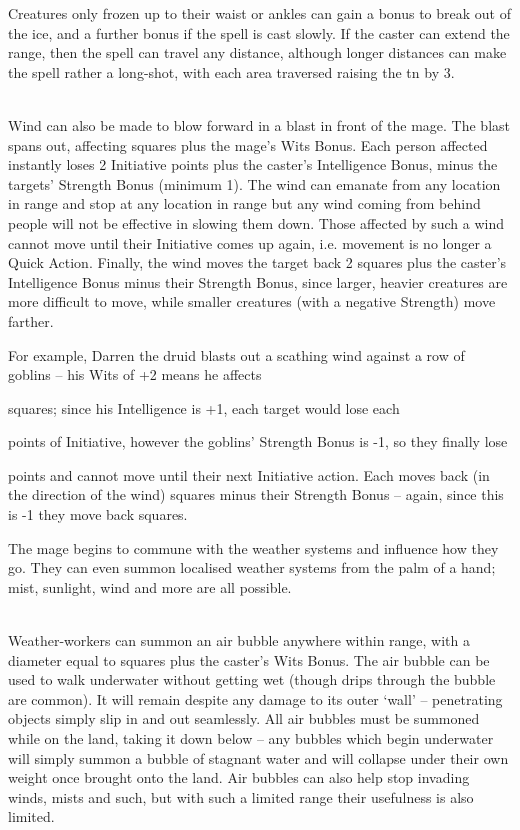 \begin{multicols}{2}
Creatures only frozen up to their waist or ankles can gain a bonus to break out of the ice, and a further bonus if the spell is cast slowly.
If the caster can extend the range, then the spell can travel any distance, although longer distances can make the spell rather a long-shot, with each area traversed raising the \gls{tn} by 3.

\\
Wind can also be made to blow forward in a blast in front of the mage.
The blast spans out, affecting  squares plus the mage's Wits Bonus.
Each person affected instantly loses 2 Initiative points plus the caster's Intelligence Bonus, minus the targets' Strength Bonus (minimum 1).
The wind can emanate from any location in range and stop at any location in range but any wind coming from behind people will not be effective in slowing them down.
Those affected by such a wind cannot move until their Initiative comes up again, i.e. movement is no longer a Quick Action.
Finally, the wind moves the target back 2 squares plus the caster's Intelligence Bonus minus their Strength Bonus, since larger, heavier creatures are more difficult to move, while smaller creatures (with a negative Strength) move farther.

For example, Darren the druid blasts out a scathing wind against a row of goblins -- his Wits of +2 means he affects \setcounter{list}{2}\addtocounter{list}{\value{spelllevel}} squares; since his Intelligence is +1, each target would lose each \setcounter{enc}{1}\addtocounter{enc}{\value{spelllevel}} points of Initiative, however the goblins' Strength Bonus is -1, so they finally lose \addtocounter{enc}{1} points and cannot move until their next Initiative action.
Each moves back (in the direction of the wind)  squares minus their Strength Bonus -- again, since this is -1 they move back  squares.

\spelllevel

The mage begins to commune with the weather systems and influence how they go. They can even summon localised weather systems from the palm of a hand; mist, sunlight, wind and more are all possible.

\\
Weather-workers can summon an air bubble anywhere within range, with a diameter equal to  squares plus the caster's Wits Bonus. The air bubble can be used to walk underwater without getting wet (though drips through the bubble are common). It will remain despite any damage to its outer `wall' -- penetrating objects simply slip in and out seamlessly. All air bubbles must be summoned while on the land, taking it down below -- any bubbles which begin underwater will simply summon a bubble of stagnant water and will collapse under their own weight once brought onto the land. Air bubbles can also help stop invading winds, mists and such, but with such a limited range their usefulness is also limited.


\end{multicols}
